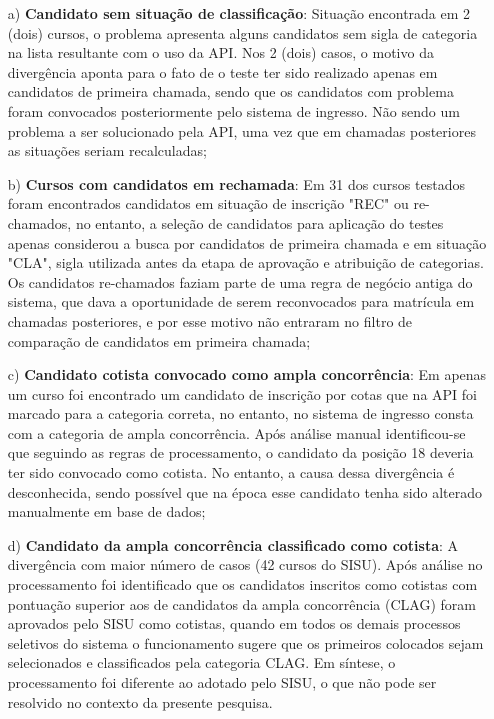 \begin{enumerate}
    \item[a)] \textbf{Candidato sem situação de classificação}: Situação encontrada em 2 (dois) cursos, o problema apresenta alguns candidatos sem sigla de categoria na lista resultante com o uso da API. Nos 2 (dois) casos, o motivo da divergência aponta para o fato de o teste ter sido realizado apenas em candidatos de primeira chamada, sendo que os candidatos com problema foram convocados posteriormente pelo sistema de ingresso. Não sendo um problema a ser solucionado pela API, uma vez que em chamadas posteriores as situações seriam recalculadas;
    
    \item[b)] \textbf{Cursos com candidatos em rechamada}: Em 31 dos cursos testados foram encontrados candidatos em situação de inscrição "REC" ou re-chamados, no entanto, a seleção de candidatos para aplicação do testes apenas considerou a busca por candidatos de primeira chamada e em situação "CLA", sigla utilizada antes da etapa de aprovação e atribuição de categorias. Os candidatos re-chamados faziam parte de uma regra de negócio antiga do sistema, que dava a oportunidade de serem reconvocados para matrícula em chamadas posteriores, e por esse motivo não entraram no filtro de comparação de candidatos em primeira chamada;
    
    \item[c)] \textbf{Candidato cotista convocado como ampla concorrência}: Em apenas um curso foi encontrado um candidato de inscrição por cotas que na API foi marcado para a categoria correta, no entanto, no sistema de ingresso consta com a categoria de ampla concorrência. Após análise manual identificou-se que seguindo as regras de processamento, o candidato da posição 18 deveria ter sido convocado como cotista. No entanto, a causa dessa divergência é desconhecida, sendo possível que na época esse candidato tenha sido alterado manualmente em base de dados;
    
      
    \item[d)] \textbf{Candidato da ampla concorrência classificado como cotista}: A divergência com maior número de casos (42 cursos do \gls{SISU}). Após análise no processamento foi identificado que os candidatos inscritos como cotistas com pontuação superior aos de candidatos da ampla concorrência (CLAG) foram aprovados pelo \gls{SISU} como cotistas, quando em todos os demais processos seletivos do sistema o funcionamento sugere que os primeiros colocados sejam selecionados e classificados pela categoria CLAG. Em síntese, o processamento foi diferente ao adotado pelo SISU, o que não pode ser resolvido no contexto da presente pesquisa.
    
\end{enumerate}

